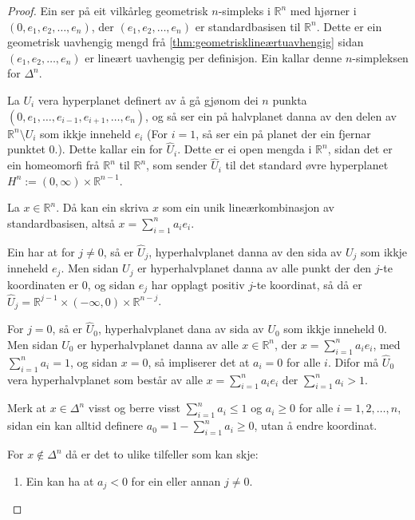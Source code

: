\documentclass[a4paper, 12pt, norsk]{article}
\theoremstyle{plain}
\theoremstyle{definition}
\newcommand{\Rb}{\mathbb{R}}
\newcommand{\tuple}[1]{ \left( #1 \right) } %
\begin{document}
\begin{proof}
	Ein ser på eit vilkårleg geometrisk \( n \)-simpleks i \( \Rb^n \) med hjørner i \( \tuple{0, e_1, e_2, \dots, e_n} \), der \( \tuple{e_1, e_2, \dots, e_n} \) er standardbasisen til \( \Rb^n \). Dette er ein geometrisk uavhengig mengd frå \autoref{thm:geometrisklineærtuavhengig} sidan \( \tuple{e_1, e_2, \dots, e_n} \) er lineært uavhengig per definisjon. Ein kallar denne \( n \)-simpleksen for \( \Delta^n \).

	La \( U_i \) vera hyperplanet definert av å gå gjønom dei \( n \) punkta \( \tuple{0, e_1, \dots, e_{i-1}, e_{i+1}, \dots, e_n} \), og så ser ein på halvplanet danna av den delen av \( \Rb^n \setminus U_i \) som ikkje inneheld \( e_i \) (For \( i=1 \), så ser ein på planet der ein fjernar punktet \( 0 \).). Dette kallar ein for \( \hat{U}_i \). Dette er ei open mengda i \( \Rb^n \), sidan det er ein homeomorfi frå \( \Rb^n \) til \( \Rb^n \), som sender \( \hat{U}_i \) til det standard øvre hyperplanet \( H^n := (0, \infty) \times \Rb^{n-1} \).

	La \( x \in \Rb^n \). Då kan ein skriva \( x \) som ein unik lineærkombinasjon av standardbasisen, altså \( x = \sum_{i=1}^n a_ie_i \). 

	Ein har at for \( j \neq 0 \), så er \( \hat{U}_j \), hyperhalvplanet danna av den sida av \( U_j \) som ikkje inneheld \( e_j \). Men sidan \( U_j \) er hyperhalvplanet danna av alle punkt der den \( j \)-te koordinaten er \( 0 \), og sidan \( e_j \) har opplagt positiv \( j \)-te koordinat, så då er \( \hat{U}_j = \Rb^{j-1}\times(-\infty, 0) \times \Rb^{n-j} \).

	For \( j = 0 \), så er \( \hat{U}_0 \), hyperhalvplanet dana av sida av \( U_0 \) som ikkje inneheld \( 0 \). Men sidan \( U_0 \) er hyperhalvplanet danna av alle \( x \in \Rb^n \),  der \( x = \sum_{i = 1}^n a_i e_i \), med \( \sum_{i = 1}^n a_i = 1 \), og sidan \( x = 0 \), så impliserer det at \( a_i = 0 \) for alle \( i \). Difor må \( \hat{U}_0 \) vera hyperhalvplanet som består av alle \( x = \sum_{i = 1}^n a_i e_i \) der \( \sum_{i = 1}^n a_i > 1 \).

	Merk at \( x \in \Delta^n \) visst og berre visst \( \sum_{i=1}^n a_i \leq 1 \) og \( a_i \geq 0 \) for alle \( i = 1, 2, \dots, n \), sidan ein kan alltid definere \( a_0 = 1 - \sum_{i=1}^n a_i \geq 0 \), utan å endre koordinat.

	For \( x \not\in \Delta^n \) då er det to ulike tilfeller som kan skje:

	\begin{enumerate}
		\item { Ein kan ha at \( a_j < 0 \) for ein eller annan \( j \neq 0 \).
		
}
\end{enumerate}
\end{proof}
\end{document}
